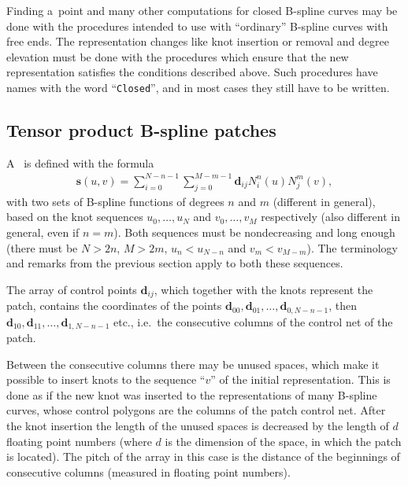 Finding a~point and many other computations for closed B-spline curves
may be done with the procedures intended to use with ``ordinary'' B-spline
curves with free ends. The representation changes like knot insertion
or removal and degree elevation must be done with the procedures which
ensure that the new representation satisfies the conditions described above.
Such procedures have names with the word ``\texttt{Closed}'', and in most cases
they still have to be written.


\subsection{Tensor product B-spline patches}

A~ is defined with the formula
\begin{align}\label{eq:BSpatch:def}
  \bm{s}(u,v) =
  \sum_{i=0}^{N-n-1}\sum_{j=0}^{M-m-1}\bm{d}_{ij}N^n_i(u) N^m_j(v),
\end{align}
with two sets of B-spline functions of degrees $n$ and $m$ (different in
general), based on the knot sequences $u_0,\ldots,u_N$ and $v_0,\ldots,v_M$
respectively (also different in general, even if $n=m$). Both sequences must
be nondecreasing and long enough (there must be $N>2n$, $M>2m$, $u_n<u_{N-n}$
and $v_m<v_{M-m}$). The terminology and remarks from the previous section
apply to both these sequences.

\begin{sloppypar}
The array of control points $\bm{d}_{ij}$, which together with the knots
represent the patch, contains the coordinates of the points
$\bm{d}_{00},\bm{d}_{01},\ldots,\bm{d}_{0,N-n-1}$, then
$\bm{d}_{10},\bm{d}_{11},\ldots,\bm{d}_{1,N-n-1}$ etc., i.e.\
the consecutive columns of the control net of the patch.
\end{sloppypar}

Between the consecutive columns there may be unused spaces, which make it
possible to insert knots to the sequence ``$v$'' of the initial representation.
This is done as if the new knot was inserted to the representations of many
B-spline curves, whose control polygons are the columns of the patch control
net. After the knot insertion the length of the unused spaces is decreased by
the length of $d$ floating point numbers (where $d$ is the dimension of
the space, in which the patch is located). The pitch of the array in this case
is the distance of the beginnings of consecutive columns (measured in floating
point numbers).

